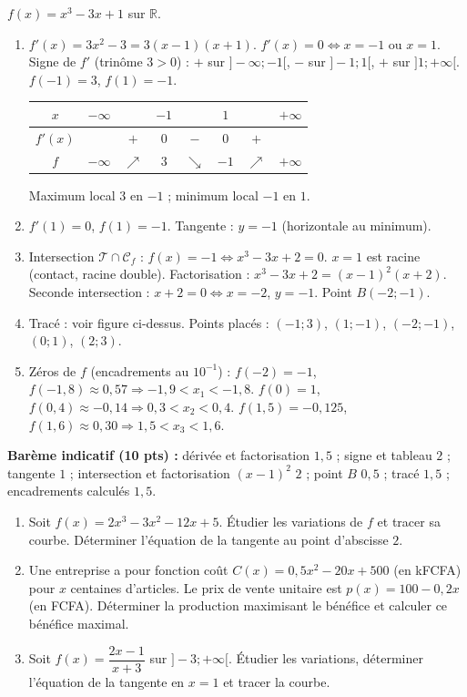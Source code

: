 \documentclass[11pt]{article}
\begin{document}
\begin{exoresolu}
$f(x)=x^3-3x+1$ sur $\mathbb{R}$.
\begin{enumerate}
    \item $f'(x)=3x^2-3=3(x-1)(x+1)$. $f'(x)=0 \iff x=-1$ ou $x=1$.
    Signe de $f'$ (trinôme $3>0$) : $+$ sur $]-\infty;-1[$, $-$ sur $]-1;1[$, $+$ sur $]1;+\infty[$.
    $f(-1)=3$, $f(1)=-1$.
    \begin{center}
    \begin{tabular}{|c|ccccccc|}\hline
    $x$ & $-\infty$ & & $-1$ & & $1$ & & $+\infty$ \\ \hline
    $f'(x)$ & & $+$ & $0$ & $-$ & $0$ & $+$ & \\ \hline
    $f$ & $-\infty$ & $\nearrow$ & $3$ & $\searrow$ & $-1$ & $\nearrow$ & $+\infty$ \\ \hline
    \end{tabular}
    \end{center}
    Maximum local $3$ en $-1$ ; minimum local $-1$ en $1$.
    \item $f'(1)=0$, $f(1)=-1$. Tangente : $\boxed{y=-1}$ (horizontale au minimum).
    \item Intersection $\mathcal{T} \cap \mathcal{C}_f$ : $f(x)=-1 \iff x^3-3x+2=0$.
    $x=1$ est racine (contact, racine double). Factorisation : $x^3-3x+2 = (x-1)^2(x+2)$.
    Seconde intersection : $x+2=0 \iff x=-2$, $y=-1$. Point $\boxed{B(-2;-1)}$.
    \item Tracé : voir figure ci-dessus. Points placés : $(-1;3)$, $(1;-1)$, $(-2;-1)$, $(0;1)$, $(2;3)$.
    \item Zéros de $f$ (encadrements au $10^{-1}$) :
    $f(-2)=-1$, $f(-1,8)\approx 0,57 \Rightarrow -1,9 < x_1 < -1,8$.
    $f(0)=1$, $f(0,4)\approx -0,14 \Rightarrow 0,3 < x_2 < 0,4$.
    $f(1,5)=-0,125$, $f(1,6)\approx 0,30 \Rightarrow 1,5 < x_3 < 1,6$.
\end{enumerate}
\textbf{Barème indicatif (10 pts) :} dérivée et factorisation $1,5$ ; signe et tableau $2$ ; tangente $1$ ; intersection et factorisation $(x-1)^2$ $2$ ; point $B$ $0,5$ ; tracé $1,5$ ; encadrements calculés $1,5$.
\end{exoresolu}

\begin{exercice}
\begin{enumerate}
    \item Soit $f(x)=2x^3-3x^2-12x+5$. Étudier les variations de $f$ et tracer sa courbe. Déterminer l'équation de la tangente au point d'abscisse $2$.
    \item Une entreprise a pour fonction coût $C(x)=0,5x^2-20x+500$ (en kFCFA) pour $x$ centaines d'articles. Le prix de vente unitaire est $p(x)=100-0,2x$ (en FCFA). Déterminer la production maximisant le bénéfice et calculer ce bénéfice maximal.
    \item Soit $f(x)=\dfrac{2x-1}{x+3}$ sur $]-3;+\infty[$. Étudier les variations, déterminer l'équation de la tangente en $x=1$ et tracer la courbe.
\end{enumerate}
\end{exercice}
\end{document}
